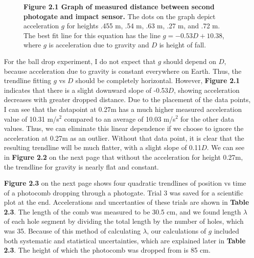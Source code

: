 \documentclass[11pt]{report}
\begin{document}
\begin{figure}[h!]
\captionsetup{labelformat=empty}
\caption{\textbf{Figure 2.1  Graph of measured distance between second photogate and
impact sensor.} The dots on the graph depict acceleration \(g\) for heights .455 m, .54
m, .63 m, .27 m, and .72 m.  The best fit line for this equation has the line
\(g = -0.53D + 10.38\), where \(g\) is acceleration due to gravity and \(D\) is
height of fall.}
\end{figure}
For the ball drop experiment, 
I do not expect that \(g\) should depend on \(D\), because acceleration due to
gravity is constant everywhere on Earth.  Thus, the trendline fitting \(g\) vs
\(D\) should be completely horizontal.  However, \textbf{Figure 2.1} indicates that there
is a slight downward slope of -0.53\(D\), showing acceleration decreases with greater dropped
distance.  Due to the placement of the data points, I can see that the
datapoint at 0.27m has a much higher measured acceleration value of 10.31
m/s$^2$ compared to an average of 10.03 m/s$^2$ for the other data values.
Thus, we can eliminate this linear dependence if we choose to ignore the
acceleration at 0.27m as an outlier.  Without that data point, it is clear that
the resulting trendline will be much flatter, with a slight slope of 0.11\(D\).
We can see in \textbf{Figure 2.2} on the next page that without the acceleration 
for height 0.27m, the trendline for gravity is nearly flat and constant.

\setlength{\parindent}{5ex}
\textbf{Figure 2.3} on the next page shows four quadratic trendlines of position vs time of a
photocomb dropping through a photogate. Trial 3 was saved for a scientific plot
at the end. Accelerations and uncertanties of these trials are shown in 
\textbf{Table 2.3}.  The length of the comb was measured to be 30.5 cm, and we 
found length $\lambda$ of each hole segment by dividing the total length by the 
number of holes, which was 35. Because of this method of calculating $\lambda$, 
our calculations of \(g\) included both systematic and statistical 
uncertainties, which are explained later in \textbf{Table 2.3}. The height of which 
the photocomb was dropped from is 85 cm.
\end{document}
